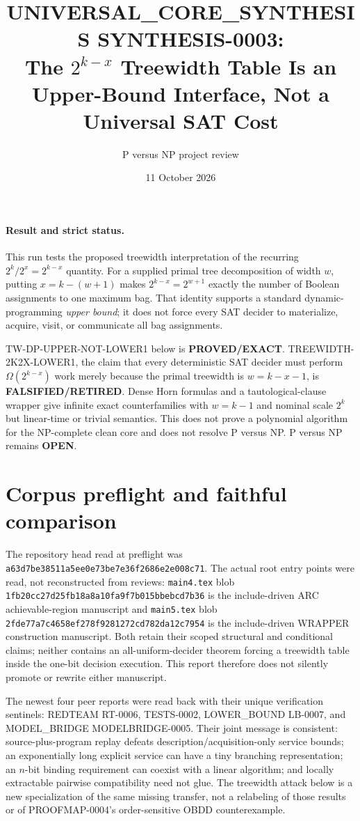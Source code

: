 \documentclass[11pt]{article}
\title{UNIVERSAL\_CORE\_SYNTHESIS SYNTHESIS-0003:\\
The $2^{k-x}$ Treewidth Table Is an Upper-Bound Interface, Not a Universal SAT Cost}
\author{P versus NP project review}
\date{11 October 2026}
\begin{document}
\maketitle

\paragraph{Result and strict status.}
This run tests the proposed treewidth interpretation of the recurring
$2^k/2^x=2^{k-x}$ quantity.  For a supplied primal tree decomposition of
width $w$, putting $x=k-(w+1)$ makes $2^{k-x}=2^{w+1}$ exactly the number of
Boolean assignments to one maximum bag.  That identity supports a standard
dynamic-programming \emph{upper bound}; it does not force every SAT decider
to materialize, acquire, visit, or communicate all bag assignments.

\textsf{TW-DP-UPPER-NOT-LOWER1} below is \textbf{PROVED/EXACT}.
\textsf{TREEWIDTH-2K2X-LOWER1}, the claim that every deterministic SAT
decider must perform $\Omega(2^{k-x})$ work merely because the primal
treewidth is $w=k-x-1$, is \textbf{FALSIFIED/RETIRED}.  Dense Horn formulas
and a tautological-clause wrapper give infinite exact counterfamilies with
$w=k-1$ and nominal scale $2^k$ but linear-time or trivial semantics.  This
does not prove a polynomial algorithm for the NP-complete clean core and does
not resolve P versus NP.  P versus NP remains \textbf{OPEN}.

\section{Corpus preflight and faithful comparison}
The repository head read at preflight was
\texttt{a63d7be38511a5ee0e73be7e36f2686e2e008c71}.  The actual root entry
points were read, not reconstructed from reviews: \texttt{main4.tex} blob
\texttt{1fb20cc27d25fb18a8a10fa9f7b015bbebcd7b36} is the include-driven ARC
achievable-region manuscript and \texttt{main5.tex} blob
\texttt{2fde77a7c4658ef278f9281272cd782da12c7954} is the include-driven WRAPPER
construction manuscript.  Both retain their scoped structural and
conditional claims; neither contains an all-uniform-decider theorem forcing a
treewidth table inside the one-bit decision execution.  This report therefore
does not silently promote or rewrite either manuscript.

The newest four peer reports were read back with their unique verification
sentinels: REDTEAM RT-0006, TESTS-0002, LOWER\_BOUND LB-0007, and
MODEL\_BRIDGE MODELBRIDGE-0005.  Their joint message is consistent:
source-plus-program replay defeats description/acquisition-only service
bounds; an exponentially long explicit service can have a tiny branching
representation; an $n$-bit binding requirement can coexist with a linear
algorithm; and locally extractable pairwise compatibility need not glue.
The treewidth attack below is a new specialization of the same missing
transfer, not a relabeling of those results or of PROOFMAP-0004's
order-sensitive OBDD counterexample.
\end{document}
